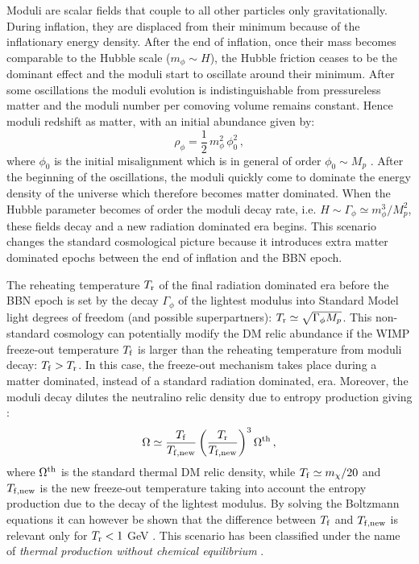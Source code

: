 \documentclass[11pt,a4paper]{article}
\newcommand{\be}{\begin{equation}}
\newcommand{\ee}{\end{equation}}
\begin{document}
Moduli are scalar fields that couple to all other particles only gravitationally. During inflation, they are displaced from their minimum because of the inflationary energy density. After the end of inflation, once their mass becomes comparable to the Hubble scale ($m_\phi \sim H$), the Hubble friction ceases to be the dominant effect and the moduli start to oscillate around their minimum. After some oscillations the moduli evolution is indistinguishable from pressureless matter and the moduli number per comoving volume remains constant. Hence moduli redshift as matter, with an initial abundance given by:
\be
\rho_\phi = \frac12 \,m_\phi^2\, \phi_0^2\,,
\ee
where $\phi_0$ is the initial misalignment which is in general of order $\phi_0 \sim M_p$ \cite{Dine:1995kz}. After the beginning of the oscillations, the moduli quickly come to dominate the energy density of the universe which therefore becomes matter dominated. When the Hubble parameter becomes of order the moduli decay rate, i.e. $H \sim \Gamma_\phi \simeq m_\phi^3/M_p^2$, these fields decay and a new radiation dominated era begins. This scenario changes the standard cosmological picture because it introduces extra matter dominated epochs between the end of inflation and the BBN epoch. 

The reheating temperature $T_{\rm r}$ of the final radiation dominated era before the BBN epoch is set by the decay $\Gamma_\phi$ of the lightest modulus into Standard Model light degrees of freedom (and possible superpartners): $T_{\rm r} \simeq \sqrt{\Gamma_\phi M_p}$. This non-standard cosmology can potentially modify the DM relic abundance if the WIMP freeze-out temperature $T_{\rm f}$ is larger than the reheating temperature from moduli decay: $T_{\rm f} > T_{\rm r}$. In this case, the freeze-out mechanism takes place during a matter dominated, instead of a standard radiation dominated, era. Moreover, the moduli decay dilutes the neutralino relic density due to entropy production giving \cite{Giudice:2000ex,McDonald:1989jd}: 
\be
\Omega \simeq \frac{T_{\rm f}}{T_{\rm f,new}}\left(\frac{T_{\rm r}}{T_{\rm f,new}}\right)^3 \Omega^{\rm th}\,,
\label{dilut}
\ee
where $\Omega^{\rm th}$ is the standard thermal DM relic density, while $T_{\rm f} \simeq m_\chi/20$ and $T_{\rm f,new}$ is the new freeze-out temperature taking into account the entropy production due to the decay of the lightest modulus. By solving the Boltzmann equations it can however be shown that the difference between $T_{\rm f}$ and $T_{\rm f,new}$ is relevant only for $T_{\rm r} < 1$ GeV \cite{Gelmini:2006pq}. This scenario has been classified under the name of \textit{thermal production without chemical equilibrium} \cite{Gelmini:2006pw}. 
\end{document}
